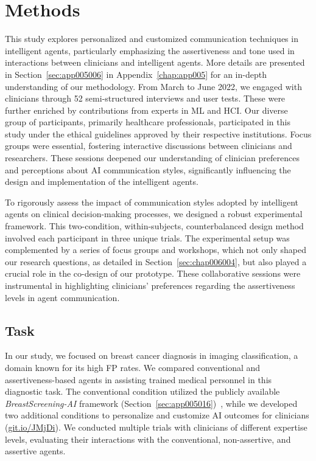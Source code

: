 \section{Methods}
\label{sec:chap006005}

\textcolor{revised}{This study explores personalized and customized communication techniques in intelligent agents, particularly emphasizing the assertiveness and tone used in interactions between clinicians and intelligent agents.
More details are presented in Section~\ref{sec:app005006} in Appendix~\ref{chap:app005} for an in-depth understanding of our methodology.
From March to June 2022, we engaged with clinicians through 52 semi-structured interviews and user tests.
These were further enriched by contributions from experts in \ac{ML} and \ac{HCI}.
Our diverse group of participants, primarily healthcare professionals, participated in this study under the ethical guidelines approved by their respective institutions.
Focus groups were essential, fostering interactive discussions between clinicians and researchers.
These sessions deepened our understanding of clinician preferences and perceptions about \ac{AI} communication styles, significantly influencing the design and implementation of the intelligent agents.}

\textcolor{revised}{To rigorously assess the impact of communication styles adopted by intelligent agents on clinical decision-making processes, we designed a robust experimental framework.
This two-condition, within-subjects, counterbalanced design method involved each participant in three unique trials.
The experimental setup was complemented by a series of focus groups and workshops, which not only shaped our research questions, as detailed in Section~\ref{sec:chap006004}, but also played a crucial role in the co-design of our prototype.
These collaborative sessions were instrumental in highlighting clinicians' preferences regarding the assertiveness levels in agent communication.}


\subsection{Task}
\label{sec:chap006005001}

In our study, we focused on breast cancer diagnosis in imaging classification, a domain known for its high \ac{FP} rates.
We compared conventional and assertiveness-based agents in assisting trained medical personnel in this diagnostic task.
The conventional condition utilized the publicly available {\it BreastScreening-AI} framework (Section~\ref{sec:app005016})~\cite{CALISTO2022102285}, while we developed two additional conditions to personalize and customize \ac{AI} outcomes for clinicians (\href{https://mida-project.github.io/prototype-multi-modality-assistant/}{git.io/JMjDi}).
We conducted multiple trials with clinicians of different expertise levels, evaluating their interactions with the conventional, non-assertive, and assertive agents.

